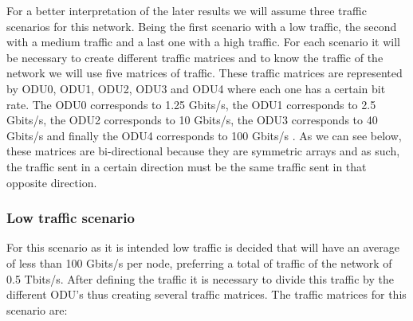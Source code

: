 For a better interpretation of the later results we will assume three traffic scenarios for this network.
Being the first scenario with a low traffic, the second with a medium traffic and a last one with a high traffic.
For each scenario it will be necessary to create different traffic matrices and to know the traffic of the network we will use five matrices of traffic.
These traffic matrices are represented by ODU0, ODU1, ODU2, ODU3 and ODU4 where each one has a certain bit rate.
The ODU0 corresponds to 1.25 Gbits/s, the ODU1 corresponds to 2.5 Gbits/s, the ODU2 corresponds to 10 Gbits/s, the ODU3 corresponds to 40 Gbits/s and finally the ODU4 corresponds to 100 Gbits/s \cite{alcatel}.
As we can see below, these matrices are bi-directional because they are symmetric arrays and as such, the traffic sent in a certain direction must be the same traffic sent in that opposite direction.

\subsubsection{Low traffic scenario}\label{low_scenario}

For this scenario as it is intended low traffic is decided that will have an average of less than 100 Gbits/s per node, preferring a total of traffic of the network of 0.5 Tbits/s.
After defining the traffic it is necessary to divide this traffic by the different ODU's thus creating several traffic matrices.
The traffic matrices for this scenario are:

